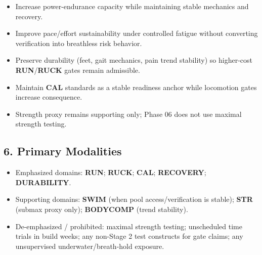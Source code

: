 \documentclass[10pt]{article}
\begin{document}
\begin{itemize}
\item Increase power-endurance capacity while maintaining stable mechanics and recovery.
\item Improve pace/effort sustainability under controlled fatigue without converting verification into breathless risk behavior.
\item Preserve durability (feet, gait mechanics, pain trend stability) so higher-cost \textbf{RUN}/\textbf{RUCK} gates remain admissible.
\item Maintain \textbf{CAL} standards as a stable readiness anchor while locomotion gates increase consequence.
\item Strength proxy remains supporting only; Phase 06 does not use maximal strength testing.
\end{itemize}

\subsection*{6. Primary Modalities}

\begin{itemize}
\item Emphasized domains: \textbf{RUN}; \textbf{RUCK}; \textbf{CAL}; \textbf{RECOVERY}; \textbf{DURABILITY}.
\item Supporting domains: \textbf{SWIM} (when pool access/verification is stable); \textbf{STR} (submax proxy only); \textbf{BODYCOMP} (trend stability).
\item De-emphasized / prohibited: maximal strength testing; unscheduled time trials in build weeks; any non-Stage 2 test constructs for gate claims; any unsupervised underwater/breath-hold exposure.
\end{itemize}
\end{document}
